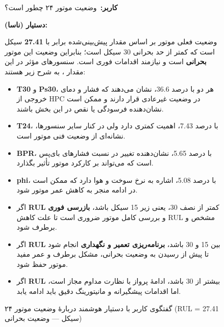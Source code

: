 \begin{figure}[h]
	\centering
	\begin{minipage}{0.95\textwidth}
		
		\begin{userBox}
			\textbf{کاربر:}\ وضعیت موتور ۲۴ چطور است؟
		\end{userBox}
		
		\begin{botBox}
			\textbf{دستیار (ناسا):}
			
			\medskip
			وضعیت فعلی موتور بر اساس مقدار پیش‌بینی‌شده
			برابر با \textbf{27.41} سیکل است که کمتر از حد بحرانی 30 سیکل است؛
			بنابراین وضعیت این موتور \textbf{بحرانی} است
			و نیازمند اقدامات فوری است. سنسورهای مؤثر در این مقدار ،
			به شرح زیر هستند:
			
			\begin{itemize}[rightmargin=1.5em, topsep=3pt, itemsep=4pt]
				\item \textbf{T30} و \textbf{Ps30}، هر دو با درصد 36.6، نشان می‌دهند که فشار و دمای
				خروجی از HPC در وضعیت غیرعادی قرار دارند و ممکن است نشان‌دهنده فرسودگی یا نقص
				در این بخش باشند.
				\item \textbf{T24}، با درصد 7.43، اهمیت کمتری دارد ولی در کنار سایر سنسورها، نشانه‌ای از
				وضعیت فنی موتور است.
				\item \textbf{BPR}، با درصد 5.65، نشان‌دهنده تغییر در نسبت فشارهای بای‌پس است که می‌تواند
				بر کارکرد موتور تأثیر بگذارد.
				\item \textbf{phi}، با درصد 5.08، اشاره به نرخ سوخت و هوا دارد که ممکن است در ادامه منجر
				به کاهش عمر موتور شود.
			\end{itemize}
			
			\medskip
			
			\begin{itemize}[rightmargin=1.5em, topsep=3pt, itemsep=4pt]
				\item اگر \textbf{RUL} کمتر از نصف 30، یعنی زیر 15 سیکل باشد،
				\textbf{بازرسی فوری} و بررسی کامل موتور ضروری است
				تا علت کاهش RUL مشخص و برطرف شود.
				\item اگر \textbf{RUL} بین 15 و 30 باشد، \textbf{برنامه‌ریزی
						تعمیر و نگهداری} انجام شود تا پیش از رسیدن به وضعیت بحرانی، مشکل برطرف و عمر
				مفید موتور حفظ شود.
				\item اگر \textbf{RUL} بیشتر از 30 باشد، ادامهٔ پرواز با نظارت مداوم مجاز است، اما
				اقدامات پیشگیرانه و مانیتورینگ دقیق باید ادامه یابد.
			\end{itemize}
			
		\end{botBox}
		
	\end{minipage}
	\caption{گفتگوی کاربر با دستیار هوشمند دربارهٔ وضعیت موتور ۲۴ (RUL = 27.41 سیکل — وضعیت بحرانی)}
	\label{qa:llm-engine-query-24}
\end{figure}


